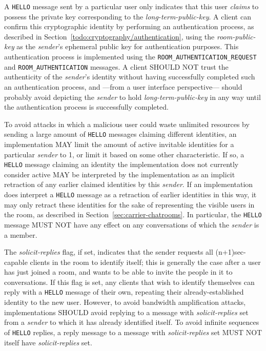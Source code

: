 \documentclass{article}
\def\message#1{\texttt{#1}}
\def\field#1{\textit{#1}}
\begin{document}
A \message{HELLO} message sent by a particular user only indicates that this user \emph{claims} to possess the private key corresponding to the \field{long-term-public-key}.
A client can confirm this cryptographic identity by performing an authentication process, as described in Section~\ref{todo:cryptography/authentication}, using the \field{room-public-key} as the \field{sender}'s ephemeral public key for authentication purposes.
This authentication process is implemented using the \message{ROOM\_AUTHENTICATION\_REQUEST} and \message{ROOM\_AUTHENTICATION} messages.
A client SHOULD NOT trust the authenticity of the \field{sender}'s identity without having successfully completed such an authentication process, and ---from a user interface perspective--- should probably avoid depicting the \field{sender} to hold \field{long-term-public-key} in any way until the authentication process is successfully completed.

To avoid attacks in which a malicious user could waste unlimited resources by sending a large amount of \message{HELLO} messages claiming different identities, an implementation MAY limit the amount of active invitable identities for a particular \field{sender} to 1, or limit it based on some other characteristic.
If so, a \message{HELLO} message claiming an identity the implementation does not currently consider active MAY be interpreted by the implementation as an implicit retraction of any earlier claimed identities by this \field{sender}.
If an implementation does interpret a \message{HELLO} message as a retraction of earlier identities in this way, it may only retract these identities for the sake of representing the visible users in the room, as described in Section~\ref{sec:carrier-chatrooms}.
In particular, the \message{HELLO} message MUST NOT have any effect on any conversations of which the \field{sender} is a member.

The \field{solicit-replies} flag, if set, indicates that the sender requests all (n+1)sec-capable clients in the room to identify itself; this is generally the case after a user has just joined a room, and wants to be able to invite the people in it to conversations.
If this flag is set, any clients that wish to identify themselves can reply with a \message{HELLO} message of their own, repeating their already-established identity to the new user.
However, to avoid bandwidth amplification attacks, implementations SHOULD avoid replying to a message with \field{solicit-replies} set from a \field{sender} to which it has already identified itself.
To avoid infinite sequences of \message{HELLO} replies, a reply message to a message with \field{solicit-replies} set MUST NOT itself have \field{solicit-replies} set.
\end{document}
